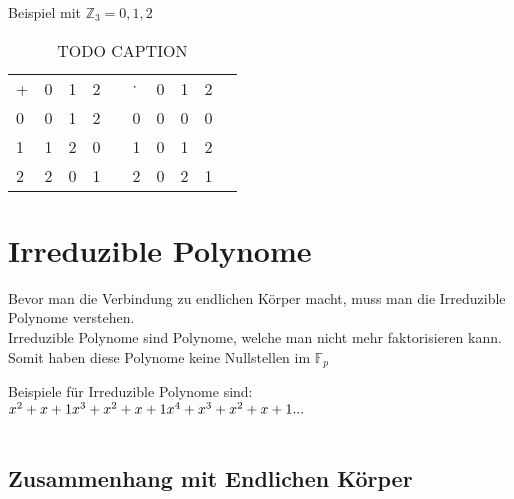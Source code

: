 Beispiel mit $ \mathbb{Z}_3 = {0,1,2} $

\begin{table}[h]\caption{TODO CAPTION}
    \begin{tabular}{l|l|l|lll|l|l|ll}
    + & 0 & 1 & 2 &  & $\cdot$ & 0 & 1 & 2 &  \\ \cline{1-4} \cline{6-9}
    0 & 0 & 1 & 2 &  & 0 & 0 & 0 & 0 &  \\ \cline{1-4} \cline{6-9}
    1 & 1 & 2 & 0 &  & 1 & 0 & 1 & 2 &  \\ \cline{1-4} \cline{6-9}
    2 & 2 & 0 & 1 &  & 2 & 0 & 2 & 1 & 
    \end{tabular}
\end{table}

\newpage
\section{Irreduzible Polynome}

Bevor man die Verbindung zu endlichen Körper macht, muss man die Irreduzible Polynome verstehen.\\
Irreduzible Polynome sind Polynome, welche man nicht mehr faktorisieren kann. Somit haben diese Polynome keine Nullstellen im $\mathbb{F}_{p} $

Beispiele für Irreduzible Polynome sind:\\
$
x^2+ x + 1\\
x^3 + x^2 + x + 1 \\
x^4 + x^3  + x^2 + x + 1\\
...
$
\\
\\
\subsection{Zusammenhang mit Endlichen Körper}

